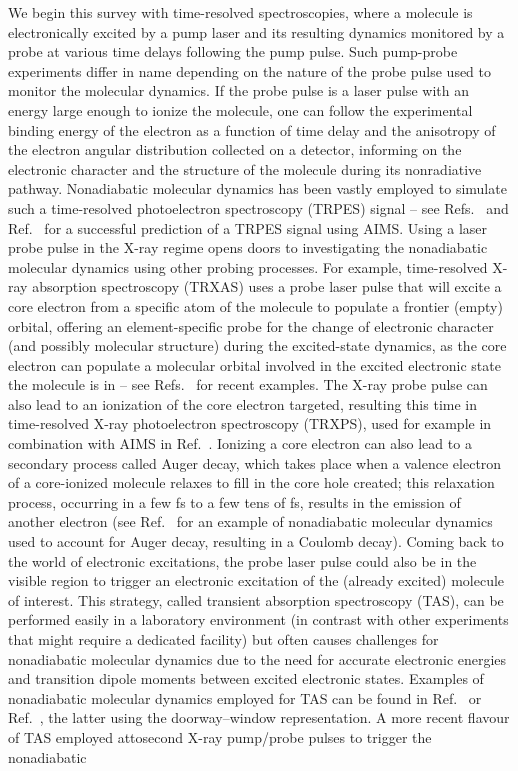 \documentclass[9pt,bestpractices]{livecoms}
\begin{document}
We begin this survey with time-resolved spectroscopies, where a molecule is electronically excited by a pump laser and its resulting dynamics monitored by a probe at various time delays following the pump pulse. Such pump-probe experiments differ in name depending on the nature of the probe pulse used to monitor the molecular dynamics. If the probe pulse is a laser pulse with an energy large enough to ionize the molecule, one can follow the experimental binding energy of the electron as a function of time delay and the anisotropy of the electron angular distribution collected on a detector, informing on the electronic character and the structure of the molecule during its nonradiative pathway.\cite{schuurman2018reviewCI} Nonadiabatic molecular dynamics has been vastly employed to simulate such a time-resolved photoelectron spectroscopy (TRPES) signal -- see Refs.~ and Ref.~ for a successful prediction of a TRPES signal using AIMS. Using a laser probe pulse in the X-ray regime opens doors to investigating the nonadiabatic molecular dynamics using other probing processes. For example, time-resolved X-ray absorption spectroscopy (TRXAS) uses a probe laser pulse that will excite a core electron from a specific atom of the molecule to populate a frontier (empty) orbital, offering an element-specific probe for the change of electronic character (and possibly molecular structure) during the excited-state dynamics, as the core electron can populate a molecular orbital involved in the excited electronic state the molecule is in -- see Refs.~ for recent examples. The X-ray probe pulse can also lead to an ionization of the core electron targeted, resulting this time in time-resolved X-ray photoelectron spectroscopy (TRXPS), used for example in combination with AIMS in Ref.~. Ionizing a core electron can also lead to a secondary process called Auger decay, which takes place when a valence electron of a core-ionized molecule relaxes to fill in the core hole created; this relaxation process, occurring in a few fs to a few tens of fs, results in the emission of another electron (see Ref.~ for an example of nonadiabatic molecular dynamics used to account for Auger decay, resulting in a Coulomb decay). Coming back to the world of electronic excitations, the probe laser pulse could also be in the visible region to trigger an electronic excitation of the (already excited) molecule of interest. This strategy, called transient absorption spectroscopy (TAS), can be performed easily in a laboratory environment (in contrast with other experiments that might require a dedicated facility) but often causes challenges for nonadiabatic molecular dynamics due to the need for accurate electronic energies and transition dipole moments between excited electronic states. Examples of nonadiabatic molecular dynamics employed for TAS can be found in Ref.~ or Ref.~, the latter using the doorway–window representation.\cite{yan1989doorwaywindow,yan1990pumpprobe} A more recent flavour of TAS employed attosecond X-ray pump/probe pulses to trigger the nonadiabatic 
\end{document}

